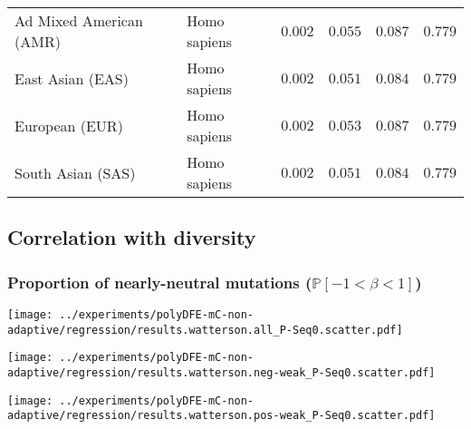 \documentclass{article}
\newcommand{\proba}{\mathbb{P}}
\newcommand{\Spop}{\beta}
\newcommand{\polyNeutral}{\proba \left[ -1 < \Spop < 1 \right]}
\begin{document}
\begin{center}
\begin{longtable}{|l|l|r|r|r|r|}
            Ad Mixed American (AMR)        & Homo sapiens        & $ 0.002$              & $ 0.055$                & $ 0.087$                 & $ 0.779$                     \\
            East Asian (EAS)               & Homo sapiens        & $ 0.002$              & $ 0.051$                & $ 0.084$                 & $ 0.779$                     \\
            European (EUR)                 & Homo sapiens        & $ 0.002$              & $ 0.053$                & $ 0.087$                 & $ 0.779$                     \\
            South Asian (SAS)              & Homo sapiens        & $ 0.002$              & $ 0.051$                & $ 0.084$                 & $ 0.779$                     \\
        \end{longtable}
    \end{center}

    \subsection{Correlation with diversity}

    \subsubsection{Proportion of nearly-neutral mutations ($\polyNeutral$)}
    \begin{minipage}{0.32\linewidth}
        \texttt{[image: ../experiments/polyDFE-mC-non-adaptive/regression/results.watterson.all\_P-Seq0.scatter.pdf]}
    \end{minipage}
    \begin{minipage}{0.32\linewidth}
        \texttt{[image: ../experiments/polyDFE-mC-non-adaptive/regression/results.watterson.neg-weak\_P-Seq0.scatter.pdf]}
    \end{minipage}
    \begin{minipage}{0.32\linewidth}
        \texttt{[image: ../experiments/polyDFE-mC-non-adaptive/regression/results.watterson.pos-weak\_P-Seq0.scatter.pdf]}
    \end{minipage}
\end{document}
